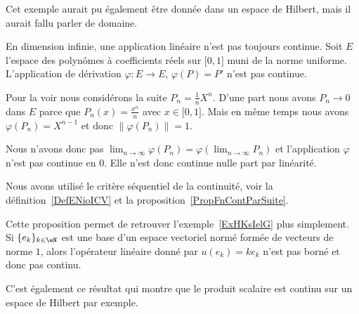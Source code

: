 Cet exemple aurait pu également être donnée dans un espace de Hilbert, mais il aurait fallu parler de domaine.

\begin{example}      \label{EXooDMVJooAJywMU}
	En dimension infinie, une application linéaire n'est pas toujours continue. Soit \( E\) l'espace des polynômes à coefficients réels sur \( \mathopen[ 0 , 1 \mathclose]\) muni de la norme uniforme. L'application de dérivation \( \varphi\colon E\to E\), \( \varphi(P)=P'\) n'est pas continue.

	Pour la voir nous considérons la suite \( P_n=\frac{1}{ n }X^n\). D'une part nous avons \( P_n\to 0\) dans \( E\) parce que \( P_n(x)=\frac{ x^n }{ n }\) avec \( x\in \mathopen[ 0 , 1 \mathclose]\). Mais en même temps nous avons \( \varphi(P_n)=X^{n-1}\) et donc \( \| \varphi(P_n) \|=1\).

	Nous n'avons donc pas \( \lim_{n\to \infty} \varphi(P_n)=\varphi(\lim_{n\to \infty} P_n)\) et l'application \( \varphi\) n'est pas continue en \( 0\). Elle n'est donc continue nulle part par linéarité.

	Nous avons utilisé le critère séquentiel de la continuité, voir la définition~\ref{DefENioICV} et la proposition~\ref{PropFnContParSuite}.
\end{example}

\begin{remark}  \label{RemOAXNooSMTDuN}
	Cette proposition permet de retrouver l'exemple~\ref{ExHKsIelG} plus simplement. Si \( \{ e_k \}_{k\in \eN}\) est une base d'un espace vectoriel normé formée de vecteurs de norme \( 1\), alors l'opérateur linéaire donné par \( u(e_k)=ke_k\) n'est pas borné et donc pas continu.
\end{remark}

C'est également ce résultat qui montre que le produit scalaire est continu sur un espace de Hilbert par exemple.

